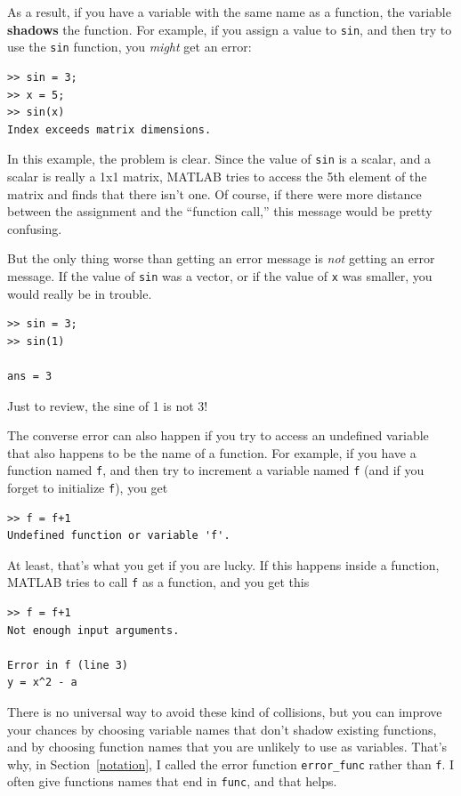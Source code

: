 \documentclass{book}
\begin{document}
As a result, if you have a variable with the same name as a function,
the variable {\bf shadows} the function.  For example, if you assign
a value to {\tt sin}, and then try to use the {\tt sin} function, you
{\em might} get an error:

\begin{verbatim}
>> sin = 3;
>> x = 5;
>> sin(x)
Index exceeds matrix dimensions.
\end{verbatim}

In this example, the problem is clear.  Since the value of {\tt sin}
is a scalar, and a scalar is really a 1x1 matrix, MATLAB tries to
access the 5th element of the matrix and finds that there isn't one.
Of course, if there were more distance between the assignment
and the ``function call,'' this message would be pretty confusing.

But the only thing worse than getting an error message is {\em not}
getting an error message.  If the value of {\tt sin} was a vector,
or if the value of {\tt x} was smaller, you would really
be in trouble.

\begin{verbatim}
>> sin = 3;
>> sin(1)

ans = 3
\end{verbatim}

Just to review, the sine of 1 is not 3!

The converse error can also happen if you try to access an
undefined variable that also happens to be the name of a function.
For example, if you have a function named {\tt f}, and then
try to increment a variable named {\tt f} (and if you forget to
initialize {\tt f}), you get

\begin{verbatim}
>> f = f+1
Undefined function or variable 'f'.
\end{verbatim}

At least, that's what you get if you are lucky.  If this happens
inside a function, MATLAB tries to call {\tt f} as a function,
and you get this

\begin{verbatim}
>> f = f+1
Not enough input arguments.

Error in f (line 3)
y = x^2 - a
\end{verbatim}

There is no universal way to avoid these kind of
collisions, but you can improve your chances by choosing
variable names that don't shadow existing functions, and by
choosing function names that you are unlikely to use as variables.
That's why, in Section~\ref{notation}, I called the error function
{\tt error\_func} rather than {\tt f}.  I often give functions
names that end in {\tt func}, and that helps.
\end{document}
